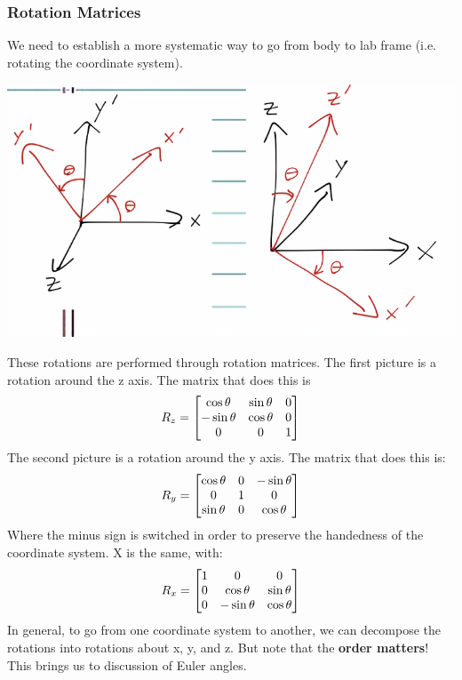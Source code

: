\subsubsection{Rotation Matrices}
We need to establish a more systematic way to go from body to lab frame (i.e. rotating the coordinate system). 
\begin{center}
    \includegraphics[scale=0.5]{Lecture-20/l20-img7.png}
\end{center}
These rotations are performed through rotation matrices. The first picture is a rotation around the z axis. The matrix that does this is
\[R_z = \begin{bmatrix}\cos\theta & \sin\theta & 0 \\ -\sin\theta & \cos\theta & 0 \\ 0 & 0 & 1\end{bmatrix}\]
The second picture is a rotation around the y axis. The matrix that does this is:
\[R_y = \begin{bmatrix}\cos\theta & 0 & -\sin\theta \\ 0 & 1 & 0 \\ \sin\theta & 0 & \cos\theta\end{bmatrix}\]
Where the minus sign is switched in order to preserve the handedness of the coordinate system. X is the same, with:
\[R_x = \begin{bmatrix}1 & 0 & 0 \\ 0 & \cos\theta & \sin\theta \\ 0 & -\sin\theta & \cos\theta\end{bmatrix}\]
In general, to go from one coordinate system to another, we can decompose the rotations into rotations about x, y, and z. But note that the \textbf{order matters}! This brings us to discussion of Euler angles.

